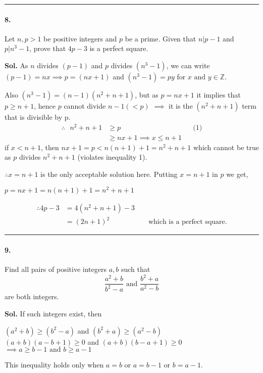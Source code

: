 \documentclass[12pt]{amsart}
\begin{document}
\par\noindent\textcolor{gray}{\rule{\textwidth}{0.5pt}}
\smallskip

\paragraph*{8.} Let $ n, p > 1 $ be positive integers and $ p $ be a prime.  Given that $ n|p-1 $ and $ p|n^3-1 $, prove that $ 4p-3 $ is a perfect square.

\bigskip
\textbf{Sol.}
As $n$ divides $(p-1)$ and $p$ divides $(n^3-1)$, we can write $(p-1) = nx \implies p = (nx+1)$ and $(n^3-1) = py$ for $x \text{ and } y \in \mathbb{Z}$.

Also $(n^3-1) = (n-1)(n^2+n+1)$, but as $p=nx+1$ it implies that $p \ge n+1$, hence $p$ cannot divide $n-1  (<p)$ $\implies$ it is the $(n^2+n+1)$ term that is divisible by p.
\begin{align*}
    \therefore \text{ } n^2+n+1 &\ge p && \text{(1)}\\ 
                                &\ge nx+1 
    \implies \boxed{x \le n+1}
\end{align*}
if $x < n+1$, then $nx+1=p < n(n+1) + 1 = n^2+n+1$ which cannot be true as $p$ divides $n^2+n+1$ (violates inequality 1).

$\therefore x=n+1 $ is the only acceptable solution here.
Putting $x=n+1$ in $p$ we get,
\begin{center}
    $p = nx + 1 = n(n+1)+1 = n^2+n+1$   
\end{center}
\begin{align*}
    \therefore 4p-3 &= 4(n^2+n+1) - 3 \\
                    &= (2n+1)^2 && \text{ which is a perfect square.}
\end{align*}

\par\noindent\textcolor{gray}{\rule{\textwidth}{0.5pt}}
\smallskip

\paragraph*{9.} Find all pairs of positive integers $ a, b $ such that
$$ \frac{a^2+b}{b^2-a} \text{ and } \frac{b^2+a}{a^2-b} $$ are both integers.

\bigskip
\textbf{Sol.}
If such integers exist, then
\begin{center}
    $(a^2+b)\ge(b^2-a)$ and $(b^2+a) \ge (a^2-b)$ \\
    $(a+b)(a-b+1) \ge0$ and $(a+b)(b-a+1) \ge0$ \\
    $\implies \boxed{a \ge b-1 \text{ and } b \ge a-1}$
\end{center}
This inequality holds only when $a=b$ or $a=b-1$ or $b=a-1$.
\end{document}
